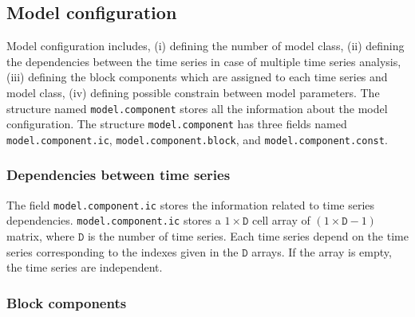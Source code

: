 \subsection{Model configuration}
\label{S:MODELCONFIGURATION}
Model configuration includes, (i) defining the number of model class, (ii) defining the dependencies between the time series in case of multiple time series analysis, (iii) defining the block components which are assigned to each time series and model class, (iv) defining possible constrain between model parameters.
The \MATLAB{} structure named \lstinline[basicstyle = \mlttfamily]!model.component! stores all the information about the model configuration.
The structure \lstinline[basicstyle = \mlttfamily]!model.component! has three fields named  \lstinline[basicstyle = \mlttfamily]!model.component.ic!, \lstinline[basicstyle = \mlttfamily]!model.component.block!, and \lstinline[basicstyle = \mlttfamily]!model.component.const!.

\subsubsection{Dependencies between time series}

The field \lstinline[basicstyle = \mlttfamily]!model.component.ic! stores the information related to time series dependencies.
\lstinline[basicstyle = \mlttfamily \small ]!model.component.ic! stores a $1\times \mathtt{D}$ cell array of $(1\times \mathtt{D}-1)$ matrix, where $\mathtt{D}$ is the number of time series.
Each time series depend on the time series corresponding to the indexes given in the $\mathtt{D}$ arrays.
If the array is empty, the time series are independent.

\subsubsection{Block components}

